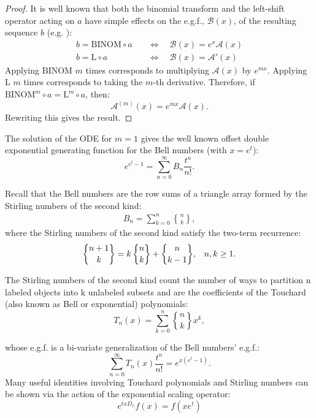 \documentclass[a4paper]{amsart}
\begin{document}
\begin{proof}
It is well known that both the binomial transform and the left-shift operator acting on $a$ have simple effects on the e.g.f., $\mathcal{B}(x)$, of the resulting sequence $b$ (e.g. \cite{bernstein1995}):
\begin{equation}\label{eq-egf-transform}
\begin{aligned}
b = \mathrm{BINOM} \circ a \quad &\iff\quad \mathcal{B}(x) = e^x \mathcal{A}(x) \\
b = \mathrm{L} \circ a \quad &\iff\quad \mathcal{B}(x) = \mathcal{A}'(x)
\end{aligned}
\end{equation}
Applying $\mathrm{BINOM}$ $m$ times corresponds to multiplying $\mathcal{A}(x)$ by $e^{mx}$. Applying $\mathrm{L}$ $m$ times corresponds to taking the $m$-th derivative. Therefore, if \(\mathrm{BINOM}^m \circ a = \mathrm{L}^m \circ a\), then:
\[
\mathcal{A}^{(m)}(x) = e^{mx} \mathcal{A}(x).
\]
Rewriting this gives the result.
\end{proof}

The solution of the ODE for $m=1$ gives the well known offset double exponential generating function for the Bell numbers (with $x = e^t$):
\begin{equation}\label{eq-bell-egf}
    e^{e^t-1} = \sum_{n=0}^{\infty} B_n \frac{t^n}{n!}.
\end{equation}

Recall that the Bell numbers are the row sums of a triangle array formed by the Stirling numbers of the second kind:
\begin{align*}
B_n = \sum_{k=0}^{n}\genfrac\{\}{0pt}{}{n}{k},
\end{align*}
where the Stirling numbers of the second kind satisfy the two-term recurrence:
\[
\genfrac\{\}{0pt}{}{n+1}{k} = k \, \genfrac\{\}{0pt}{}{n}{k} + \genfrac\{\}{0pt}{}{n}{k-1}, \,\,\,\,\, n, k \ge 1\\.
\]

The Stirling numbers of the second kind count the number of ways to partition n labeled objects into k unlabeled subsets and are the coefficients of the Touchard (also known as Bell or exponential) polynomials:
\begin{equation}\label{eq-touchard-def}
    T_n(x) = \sum_{k=0}^{n} \genfrac\{\}{0pt}{}{n}{k} x^k,
\end{equation}

whose e.g.f. is a bi-variate generalization of the Bell numbers' e.g.f.:
\begin{equation}\label{eq-touchard-egf}
    \sum_{n=0}^{\infty} T_n(x) \frac{t^n}{n!} = e^{x(e^t-1)}.
\end{equation}
Many useful identities involving Touchard polynomials and Stirling numbers can be shown via the action of the exponential scaling operator:
\begin{equation}\label{eq-scaling-operator}
    e^{txD_x}f(x)=f(xe^t)
\end{equation}
\end{document}
